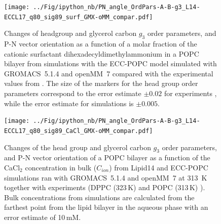 \documentclass[journal=jpcbfk]{achemso}
\begin{document}
\begin{figure}[!p]
  \centering
  \texttt{[image: ../Fig/ipython\_nb/PN\_angle\_OrdPars-A-B-g3\_L14-ECCL17\_q80\_sig89\_surf\_GMX-oMM\_compar.pdf]}
  \caption{\label{fig:ordPars_surf_GMX_oMM_compar}
    Changes of headgroup and glycerol carbon $g_3$ order parameters, and P-N vector orientation as a function of
    a molar fraction of the cationic surfactant dihexadecyldimethylammonium in a POPC bilayer
    from simulations with the ECC-POPC model
    simulated with GROMACS~5.1.4 \cite{Abraham15} and openMM~7 \cite{openmm7} 
    compared with the experimental values from \cite{scherer89}.
    The size of the markers for the head group order parameters correspond to
    the error estimate $\pm 0.02$ for experiments \cite{botan15,ollila16},
    while the error estimate for simulations is $\pm 0.005$.
  }
\end{figure}

\begin{figure}[!p]
  \centering
  \texttt{[image: ../Fig/ipython\_nb/PN\_angle\_OrdPars-A-B-g3\_L14-ECCL17\_q80\_sig89\_CaCl\_GMX-oMM\_compar.pdf]}
  \caption{\label{fig:ordPars_cacl_GMX_oMM_compar}
    Changes of the head group and glycerol carbon $g_3$ order parameters, and P-N vector orientation of a POPC bilayer 
    as a function of the CaCl$_2$ concentration in bulk ($C_{ion}$)
    from Lipid14 \cite{dickson14} and ECC-POPC simulations ran
    with GROMACS~5.1.4 \cite{Abraham15} and openMM~7 \cite{openmm7} at 313~K
    together with experiments (DPPC (323\,K) \cite{akutsu81} and POPC (313\,K) \cite{altenbach84}). 
    Bulk concentrations from simulations are calculated 
    from the farthest point from the lipid bilayer in the aqueous phase
    with an error estimate of 10\,mM.
  }
\end{figure}

\newpage
\end{document}
